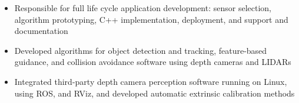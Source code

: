 	\begin{itemize} [leftmargin = \itemmargin]
				
		\item Responsible for full life cycle application development: sensor selection, algorithm prototyping, C++ implementation, deployment, and support and documentation

		\item Developed algorithms for object detection and tracking, feature-based guidance, and collision avoidance software using depth cameras and LIDARs

		\item Integrated third-party depth camera perception software running on Linux, using ROS, and RViz, and developed automatic extrinsic calibration methods
		
	\end{itemize} \\